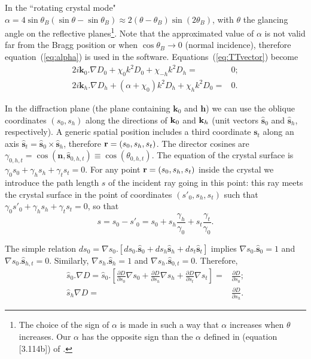\documentclass[preprint]{iucr}              %
\newcommand{\inred}[1]{{\color{red}#1}}
\begin{document}
In the ``rotating crystal mode" $\alpha=4 \sin \theta_B (\sin \theta - \sin \theta_B) \approx 2 (\theta-\theta_B) \sin (2\theta_B)$, with $\theta$ the glancing angle on the reflective planes\footnote{The choice of the sign of $\alpha$ is made in such a way that $\alpha$ increases when $\theta$ increases. \inred{Our $\alpha$ has the opposite sign than the $\alpha$ defined in (equation [3.114b]) of \cite{ZachariasenBook}.}}.
Note that the approximated value of $\alpha$ is not valid far from the Bragg position or when $\cos\theta_B \rightarrow 0$ (normal incidence), therefore  equation~(\ref{eq:alpha}) is used in the software.
Equations~(\ref{eq:TTvector})  become
\begin{subequations}
\label{eq:TTvectorAlpha}
\begin{align}
2 i \textbf{k}_0 . \nabla D_0 + \chi_0 k^2 D_0 + \chi_{-h} k^2 D_h =& 0; \\
2 i \textbf{k}_h . \nabla D_h + (\alpha + \chi_0) k^2 D_h + \chi_{h} k^2 D_0 =& 0.
\end{align}
\end{subequations}

In the diffraction plane (the plane containing $\textbf{k}_0$ and $\textbf{h}$) 
we can use the oblique coordinates $(s_0,s_h)$ along the directions of $\textbf k_0$ and $\textbf k_h$ (unit vectors $\hat{ \textbf{s}}_{0}$ and $\hat{ \textbf{s}}_{h}$, respectively). A generic spatial position includes a third coordinate $\textbf{s}_t$ along an axis $\hat{\textbf{s}}_t=\hat{\textbf{s}}_0 \times \hat{\textbf{s}}_h$, therefore $\textbf r=(s_0,s_h,s_t)$. The director cosines are $\gamma_{0,h,t}=\cos(\textbf{n} , \hat{\textbf{s}}_{0,h,t}) \equiv \cos(\theta_{0,h,t})$. The equation of the crystal surface is $\gamma_0 s_0 + \gamma_h s_h + \gamma_t s_t=0$. For any point $\textbf r=(s_0,s_h,s_t)$ inside the crystal we introduce the path length $s$ of the incident ray going in this point: this ray meets the crystal surface in the point of coordinates $(s'_0,s_h,s_t)$ such that $\gamma_0 s'_0+\gamma_h s_h + \gamma_t s_t=0$, so that 
\begin{equation}
\label{eq:s}
s = s_0 - s'_0 = s_0 + s_h \frac{\gamma_h}{\gamma_0} + s_t \frac{\gamma_t}{\gamma_0}.
\end{equation}

The simple relation $d s_0 = \nabla s_0 . [ d s_0 . \hat{\textbf{s}}_0 + d s_h \hat{\textbf{s}}_h + d s_t \hat{\textbf{s}}_t ]$ implies $\nabla s_0 . \hat{\textbf{s}}_0=1$ and $\nabla s_0 . \hat{\textbf{s}}_{h,t}=0$. Similarly, $\nabla s_h . \hat{\textbf{s}}_h=1$ and $\nabla s_h . \hat{\textbf{s}}_{0,t}=0$. Therefore, 
\begin{subequations}
\label{eq:equalities}
\begin{align}
\hat s_0 . \nabla D=
\hat s_0 . \left[ 
\frac{\partial D}{\partial s_0} \nabla s_0 + 
\frac{\partial D}{\partial s_h} \nabla s_h +
\frac{\partial D}{\partial s_t} \nabla s_t
\right] 
=& \frac{\partial D}{\partial s_0}
; \\
\hat s_h \nabla D =& 
\frac{\partial D}{\partial s_h}.
\end{align}
\end{subequations}
\end{document}
